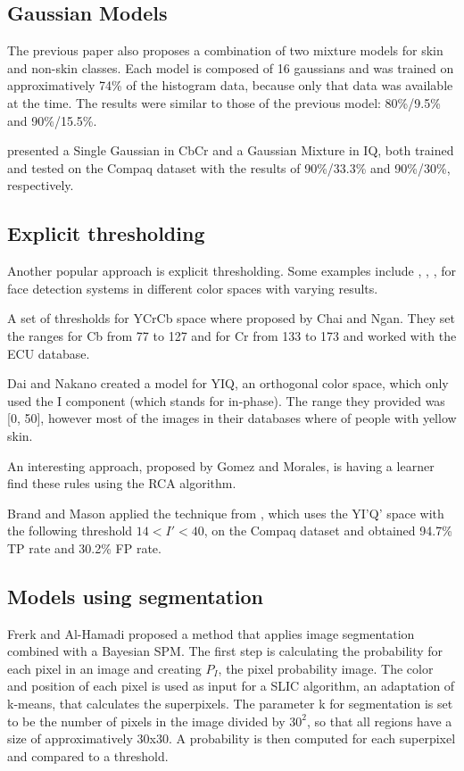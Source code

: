 \documentclass[12pt]{report}
\begin{document}
	\subsection{Gaussian Models}
	The previous paper\cite{compaq} also proposes a combination of two mixture models for skin and non-skin classes. Each model is composed of 16 gaussians and was trained on approximatively 74\% of the histogram data, because only that data was available at the time. The results were similar to those of the previous model: 80\%/9.5\% and 90\%/15.5\%.
	
	\cite{gaussian_applied} presented a Single Gaussian in CbCr and a Gaussian Mixture in IQ, both trained and tested on the Compaq dataset with the results of 90\%/33.3\% and 90\%/30\%, respectively.
	
	\subsection{Explicit thresholding}
	Another popular approach is explicit thresholding. Some examples include \cite{rgb_threshold}, \cite{cr_cb_threshold}, \cite{yiq_threshold}, \cite{i_threshold} for face detection systems in different color spaces with varying results. 
 	
 	A set of thresholds for YCrCb space where proposed by Chai and Ngan\cite{cr_cb_threshold}. They set the ranges for Cb from 77 to 127 and for Cr from 133 to 173 and worked with the ECU database.
 	
 	Dai and Nakano\cite{yiq_threshold} created a model for YIQ, an orthogonal color space, which only used the I component (which stands for in-phase). The range they provided was [0, 50], however most of the images in their databases where of people with yellow skin.
 	
 	An interesting approach, proposed by Gomez and Morales\cite{rca_threshold}, is having a learner find these rules using the RCA algorithm.
 	
 	Brand and Mason \cite{i_threshold_applied} applied the technique from \cite{i_threshold}, which uses the YI'Q' space with the following threshold \(14 < I' < 40\), on the Compaq dataset and obtained 94.7\% TP rate and 30.2\% FP rate.
 	
 	\subsection{Models using segmentation}
 	Frerk and Al-Hamadi\cite{superpixels_applied_1} proposed a method that applies image segmentation combined with a Bayesian SPM. The first step is calculating the probability for each pixel in an image and creating \(P_I\), the pixel probability image. The color and position of each pixel is used as input for a SLIC algorithm, an adaptation of k-means, that calculates the superpixels. The parameter k for segmentation is set to be the number of pixels in the image divided by \(30^2\), so that all regions have a size of approximatively 30x30. A probability is then computed for each superpixel and compared to a threshold.
 	
\end{document}
